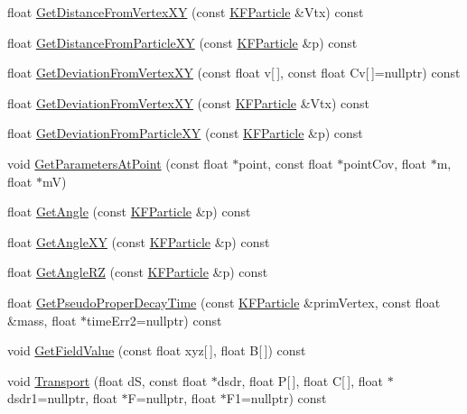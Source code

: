 \begin{DoxyCompactItemize}
\item 
float \hyperlink{classKFParticle_a204fe1adf6462b2baa8252cdb68e02f6}{Get\+Distance\+From\+Vertex\+XY} (const \hyperlink{classKFParticle}{K\+F\+Particle} \&Vtx) const 
\item 
float \hyperlink{classKFParticle_a70201c84649ebcbe60bddc5fb8a40e82}{Get\+Distance\+From\+Particle\+XY} (const \hyperlink{classKFParticle}{K\+F\+Particle} \&p) const 
\item 
float \hyperlink{classKFParticle_a08a4ff3f7c5034a431663bf016afc80f}{Get\+Deviation\+From\+Vertex\+XY} (const float v\mbox{[}$\,$\mbox{]}, const float Cv\mbox{[}$\,$\mbox{]}=nullptr) const 
\item 
float \hyperlink{classKFParticle_a40f3c5fe862d46e27a0e26947eb6ffa8}{Get\+Deviation\+From\+Vertex\+XY} (const \hyperlink{classKFParticle}{K\+F\+Particle} \&Vtx) const 
\item 
float \hyperlink{classKFParticle_a47d3c37061b44cea9558b2c5efb196c8}{Get\+Deviation\+From\+Particle\+XY} (const \hyperlink{classKFParticle}{K\+F\+Particle} \&p) const 
\item 
void \hyperlink{classKFParticle_aaf8fa9176455e4b34628568d33276069}{Get\+Parameters\+At\+Point} (const float $\ast$point, const float $\ast$point\+Cov, float $\ast$m, float $\ast$mV)
\item 
float \hyperlink{classKFParticle_a8dc18521243e2042e4aec0d5f821bac8}{Get\+Angle} (const \hyperlink{classKFParticle}{K\+F\+Particle} \&p) const 
\item 
float \hyperlink{classKFParticle_a8d4e9e9471f7bf3af01c637b28f7653c}{Get\+Angle\+XY} (const \hyperlink{classKFParticle}{K\+F\+Particle} \&p) const 
\item 
float \hyperlink{classKFParticle_aae77af43f2d9a88ff8dd7b80c65d44cb}{Get\+Angle\+RZ} (const \hyperlink{classKFParticle}{K\+F\+Particle} \&p) const 
\item 
float \hyperlink{classKFParticle_a7eb8965f66ac808147a95b27dc7162e9}{Get\+Pseudo\+Proper\+Decay\+Time} (const \hyperlink{classKFParticle}{K\+F\+Particle} \&prim\+Vertex, const float \&mass, float $\ast$time\+Err2=nullptr) const 
\item 
void \hyperlink{classKFParticle_a586922b2bf23f335bf999f50ff5d633f}{Get\+Field\+Value} (const float xyz\mbox{[}$\,$\mbox{]}, float B\mbox{[}$\,$\mbox{]}) const 
\item 
void \hyperlink{classKFParticle_a62f4f92c046f9690260b22fce67307e7}{Transport} (float dS, const float $\ast$dsdr, float P\mbox{[}$\,$\mbox{]}, float C\mbox{[}$\,$\mbox{]}, float $\ast$dsdr1=nullptr, float $\ast$F=nullptr, float $\ast$F1=nullptr) const 
\end{DoxyCompactItemize}
